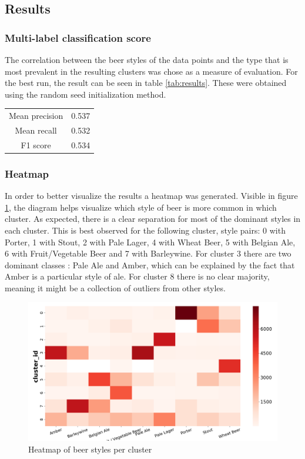 \documentclass[12pt]{article}
\begin{document}
	\subsection{Results}
	\subsubsection{Multi-label classification score}
	The correlation between the beer styles of the data points and the type that is most prevalent in the resulting clusters was chose as a measure of evaluation. For the best run, the result can be seen in table \ref{tab:results}. These were obtained using the random seed initialization method.
	
	\begin{center}
		\label{tab:results}
		\begin{tabular}{ |c|c| } 
			\hline
			Mean precision & 0.537 \\
			Mean recall & 0.532 \\
			F1 score & 0.534 \\
			\hline
		\end{tabular}
	\end{center}

	\subsubsection{Heatmap}
	In order to better visualize the results a heatmap was generated. Visible in figure \ref{fig:heatmap}, the diagram helps visualize which style of beer is more common in which cluster. As expected, there is a clear separation for most of the dominant styles in each cluster. This is best observed for the following cluster, style pairs: 0 with Porter, 1 with Stout, 2 with Pale Lager, 4 with Wheat Beer, 5 with Belgian Ale, 6 with Fruit/Vegetable Beer and 7 with Barleywine. For cluster 3 there are two dominant classes : Pale Ale and Amber, which can be explained by the fact that Amber is a particular style of ale. For cluster 8 there is no clear majority, meaning it might be a collection of outliers from other styles.
	
	\begin{figure}
		\includegraphics[width=\linewidth]{resources/9500rheatmap.png}
		\caption{Heatmap of beer styles per cluster}
		\label{fig:heatmap}
	\end{figure}
	
\end{document}
